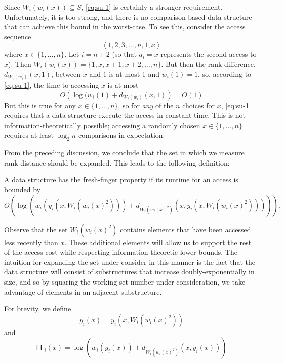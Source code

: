 \documentclass{llncs}
\newcommand{\BigOh}[1]{O\!\left(#1\right)}
\newcommand{\SU}[1]{\textsf{FF}_i\!\left(#1\right)}
\begin{document}
Since $W_i(w_i(x))\subseteq S$, \eqref{eq:su-1} is certainly a stronger requirement.  Unfortunately, it is too strong, and there is no comparison-based data structure that can achieve this bound in the worst-case. To see this, consider the access sequence
\begin{displaymath}
	\left\langle 1,2,3,\ldots,n,1,x \right\rangle
\end{displaymath}
where $x \in \{1,\ldots,n\}$.  Let $i={n+2}$ (so that $a_i =x$ represents the second access to $x$).  Then $W_i(w_i(x)) = \{1,x,x+1,x+2,\ldots,n\}$.  But then the rank difference, $d_{W_i(w_i)}(x,1)$, between $x$ and $1$ is at most 1 and $w_i(1)=1$, so, according to \eqref{eq:su-1}, the time to accessing $x$ is at most\[
   \BigOh{\log(w_i(1)+d_{W_i(w_i)}(x,1)} = \BigOh{1}
\]
But this is true for any $x\in\{1,\ldots,n\}$, so for \emph{any} of the $n$ choices for $x$, \eqref{eq:su-1} requires that a data structure execute the access in constant time. This is not information-theoretically possible; accessing a randomly chosen $x\in\{1,\ldots,n\}$ requires at least $\log_2 n$ comparisons in expectation.  %

From the preceding discussion, we conclude that the set in which we measure rank distance should be expanded.  This leads to the following definition:

\begin{definition} A data structure has the fresh-finger property if its runtime for an access is bounded by
\begin{displaymath}
	\BigOh{\log (w_i(y_i(x,W_i(w_i(x)^2))) + d_{W_i(w_i(x)^2)}(x,y_i(x,W_i(w_i(x)^2))))}.
\end{displaymath}
\end{definition}

Observe that the set $W_i(w_i(x)^2)$ contains elements that have been accessed less recently than $x$. These additional elements will allow us to support the rest of the access cost while respecting information-theoretic lower bounds. The intuition for expanding the set under consider in this manner is the fact that the data structure will consist of substructures that increase doubly-exponentially in size, and so by squaring the working-set number under consideration, we take advantage of elements in an adjacent substructure.

For brevity, we define
\begin{displaymath}
	y_i(x) = y_i(x,W_i(w_i(x)^2))
\end{displaymath}
and
\begin{displaymath}
	\SU{x} = \log (w_i(y_i(x)) + d_{W_i(w_i(x)^2)}(x,y_i(x)))
\end{displaymath}
\end{document}
